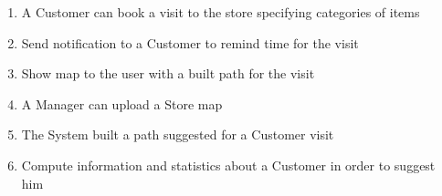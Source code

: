 \documentclass[a4paper, 10pt, oneside]{article}
\newcommand*{\lorenzo}[1]{\textcolor{BurntOrange}{#1}}
\newcommand{\giovanni}[1]{\textcolor{Blue}{#1}}
\begin{document}
\begin{itemize}
\begin{enumerate}[label={S.S.\arabic{*}}]
        
        \item A Customer can book a visit to the store specifying categories of items
        \item Send notification to a Customer to remind time for the visit
        \item Show map to the user with a built path for the visit
        
        \item A Manager can upload a Store map
        \item The System built a path suggested for a Customer visit
        
        \item Compute information and statistics about a Customer in order to suggest him 
        
        
        
        

\end{enumerate}
\end{itemize}
\end{document}
